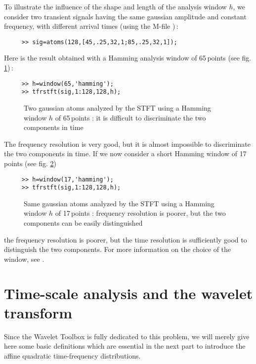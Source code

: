   To illustrate the influence of the shape and length of the analysis
window $h$, we consider two transient signals having the same gaussian
amplitude and constant frequency, with different arrival times (using the
M-file )\,:
\begin{verbatim}
     >> sig=atoms(128,[45,.25,32,1;85,.25,32,1]);
\end{verbatim}
Here is the result obtained with a Hamming analysis window of 65\,points
(see fig. \ref{At1fig7})\,: 
\begin{verbatim}
     >> h=window(65,'hamming');
     >> tfrstft(sig,1:128,128,h);
\end{verbatim}
\begin{figure}[htb]
\epsfxsize=10cm
\epsfysize=8cm
\centerline{}
\caption{\label{At1fig7}Two gaussian atoms analyzed by the STFT using a
Hamming window $h$ of 65\,points : it is difficult to discriminate the two
components in time}
\end{figure}
The frequency resolution is very good, but it is almost impossible to
discriminate the two components in time. If we now consider a short Hamming
window of 17\,points (see fig. \ref{At1fig8})
\begin{verbatim}
     >> h=window(17,'hamming');
     >> tfrstft(sig,1:128,128,h);
\end{verbatim}
\begin{figure}[htb]
\epsfxsize=10cm
\epsfysize=8cm
\centerline{}
\caption{\label{At1fig8}Same gaussian atoms analyzed by the STFT using a
Hamming window $h$ of 17\,points : frequency resolution is poorer, but the
two components can be easily distinguished}
\end{figure}
the frequency resolution is poorer, but the time resolution is sufficiently
good to distinguish the two components. For more information on the choice
of the window, see \cite{HAR78}.


\section{Time-scale analysis and the wavelet transform}
  Since the Wavelet Toolbox is fully dedicated to this problem, we will
merely give here some basic definitions which are essential in the next
part to introduce the affine quadratic time-frequency distributions.

